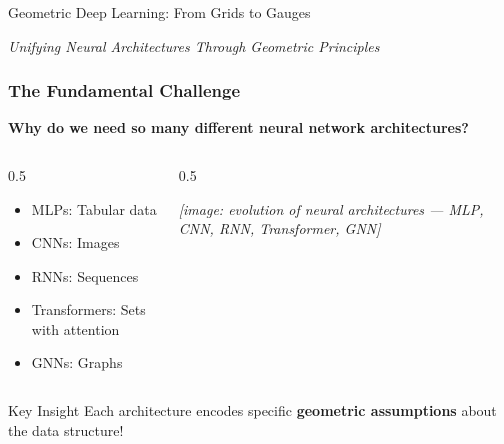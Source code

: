 \begin{frame}[fragile]\frametitle{}
\begin{center}
{\Large Geometric Deep Learning: From Grids to Gauges}
\vspace{0.5cm}

{\em Unifying Neural Architectures Through Geometric Principles}
\end{center}
\end{frame}

\begin{frame}[fragile]\frametitle{The Fundamental Challenge}

\begin{center}
\textbf{Why do we need so many different neural network architectures?}
\end{center}

\begin{columns}
\begin{column}{0.5\textwidth}
\begin{itemize}
\item MLPs: Tabular data
\item CNNs: Images 
\item RNNs: Sequences
\item Transformers: Sets with attention
\item GNNs: Graphs
\end{itemize}
\end{column}
\begin{column}{0.5\textwidth}
\begin{center}
\textit{[image: evolution of neural architectures — MLP, CNN, RNN, Transformer, GNN]}
\end{center}
\end{column}
\end{columns}

\vspace{0.5cm}
\begin{alertblock}{Key Insight}
Each architecture encodes specific \textbf{geometric assumptions} about the data structure!
\end{alertblock}

\end{frame}

